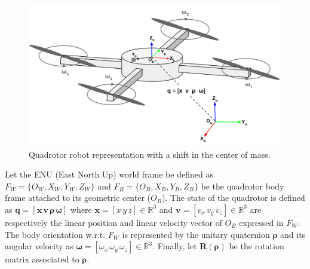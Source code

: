 \begin{figure} [t]
    \centering
    \includegraphics[width=0.8\linewidth]{figures/models/drone.png} 
    \caption{Quadrotor robot representation with a shift in the center of mass.}%
    \label{fig:quad}%
\end{figure}

Let the ENU (East North Up) world frame be defined as $F_W \allowbreak = \allowbreak \{O_W, \allowbreak X_W, \allowbreak Y_W, \allowbreak Z_W\}$ and $F_B = \allowbreak\{O_B, \allowbreak X_B, \allowbreak Y_B, \allowbreak Z_B\}$ be the quadrotor body frame attached to its geometric center ($O_B$).
The state of the quadrotor is defined as $\boldsymbol{q} = [\boldsymbol{x}  \, \boldsymbol{v} \, \boldsymbol{\rho} \, \boldsymbol{\omega}]$ where $\boldsymbol{x} = [x \, y \,z] \in \mathbb{R}^{3}$ and $\boldsymbol{v} = [v_x \, v_y \,v_z] \in \mathbb{R}^{3}$ are respectively the linear position and linear velocity vector of $O_B$ expressed in $F_W$. The body orientation w.r.t. $F_W$ is represented by the unitary quaternion $\boldsymbol{\rho}$ and its angular velocity as $\boldsymbol{\omega} = [\omega_x \, \omega_y \, \omega_z] \in \mathbb{R}^{3}$. 
Finally, let $\boldsymbol{R(\rho)}$ be the rotation matrix associated to $\boldsymbol{\rho}$.

